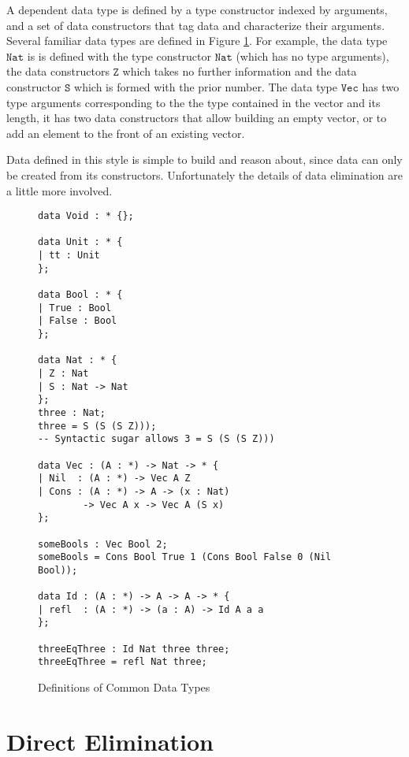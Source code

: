 A dependent data type is defined by a type constructor indexed by
arguments, and a set of data constructors that tag data and characterize
their arguments. Several familiar data types are defined in Figure
\ref{fig:data-defs}. For example, the data type $\mathtt{Nat}$ is
is defined with the type constructor $\mathtt{Nat}$ (which has no
type arguments), the data constructors $\mathtt{Z}$ which takes no
further information and the data constructor $\mathtt{S}$ which is
formed with the prior number. The data type $\mathtt{Vec}$ has two
type arguments corresponding to the the type contained in the vector
and its length, it has two data constructors that allow building an
empty vector, or to add an element to the front of an existing vector.

Data defined in this style is simple to build and reason about, since
data can only be created from its constructors. Unfortunately the
details of data elimination are a little more involved.

\begin{figure}
\begin{lstlisting}[basicstyle={\ttfamily\small}]
data Void : * {};

data Unit : * {
| tt : Unit
};

data Bool : * {
| True : Bool
| False : Bool
};
 
data Nat : * {
| Z : Nat
| S : Nat -> Nat
};
three : Nat;
three = S (S (S Z)));
-- Syntactic sugar allows 3 = S (S (S Z)))

data Vec : (A : *) -> Nat -> * {
| Nil  : (A : *) -> Vec A Z
| Cons : (A : *) -> A -> (x : Nat)
        -> Vec A x -> Vec A (S x)
};

someBools : Vec Bool 2;
someBools = Cons Bool True 1 (Cons Bool False 0 (Nil Bool));

data Id : (A : *) -> A -> A -> * {
| refl  : (A : *) -> (a : A) -> Id A a a
};

threeEqThree : Id Nat three three;
threeEqThree = refl Nat three;
\end{lstlisting}
 \caption{Definitions of Common Data Types}
\label{fig:data-defs}
\end{figure}


\section{Direct Elimination}

